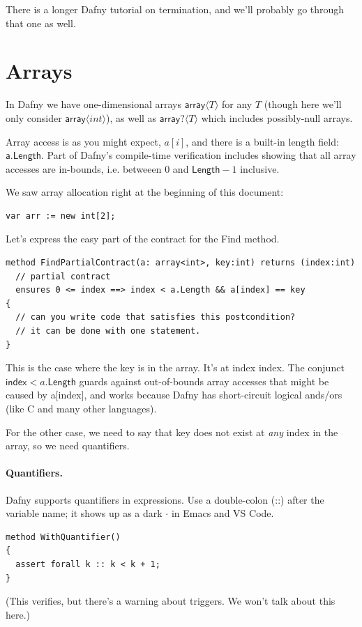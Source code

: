 \documentclass[11pt]{article}
\begin{document}
There is a longer Dafny tutorial on termination, and we'll probably go through that one as well.

\section*{Arrays}
In Dafny we have one-dimensional arrays $\mathsf{array}\langle T \rangle$ for any $T$ (though here we'll only consider
$\mathsf{array}\langle int \rangle$), as well as $\mathsf{array}?\langle T \rangle$ which includes possibly-null arrays.

Array access is as you might expect, $a[i]$, and there is a built-in
length field: $\mathsf{a}.\mathsf{Length}$.  Part of Dafny's
compile-time verification includes showing that all array accesses are
in-bounds, i.e.  betweeen 0 and $\textsf{Length}-1$ inclusive.

We saw array allocation right at the beginning of this document:
\begin{lstlisting}[language=dafny]
    var arr := new int[2];
\end{lstlisting}

Let's express the easy part of the contract for the \textsf{Find} method.
\begin{lstlisting}[language=dafny]
method FindPartialContract(a: array<int>, key:int) returns (index:int)
  // partial contract
  ensures 0 <= index ==> index < a.Length && a[index] == key
{
  // can you write code that satisfies this postcondition?
  // it can be done with one statement.
}
\end{lstlisting}
This is the case where the key is in the array. It's at index \textsf{index}.
The conjunct $\mathsf{index} < a.\mathsf{Length}$ guards against out-of-bounds array
accesses that might be caused by \textsf{a[index]}, and works because Dafny has short-circuit
logical ands/ors (like C and many other languages).

For the other case, we need to say that \textsf{key} does not exist at \emph{any}
index in the array, so we need quantifiers.

\paragraph{Quantifiers.} Dafny supports quantifiers in expressions. Use a double-colon (::)
after the variable name; it shows up as a dark $\cdot$ in Emacs and VS Code.

\begin{lstlisting}[language=dafny]
method WithQuantifier()
{
  assert forall k :: k < k + 1;
}
\end{lstlisting}
(This verifies, but there's a warning about triggers. We won't talk about this here.)
\end{document}
